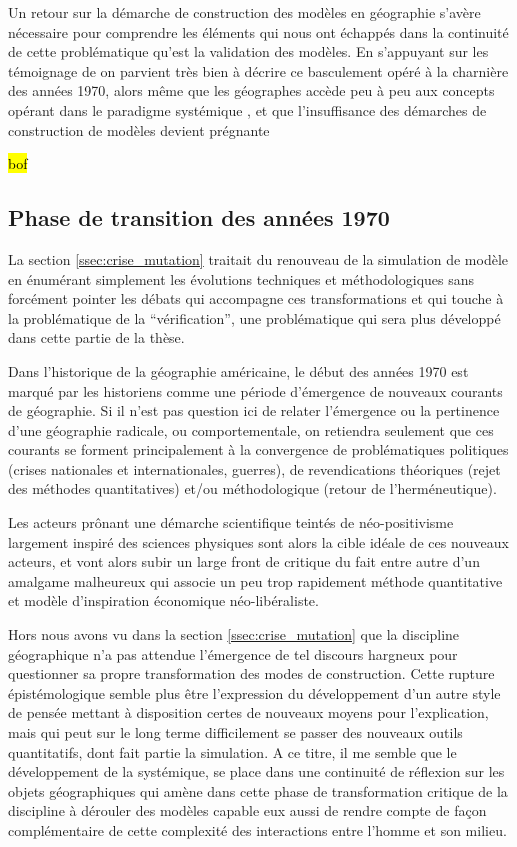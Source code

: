 Un retour sur la démarche de construction des modèles en géographie s'avère nécessaire pour comprendre les éléments qui nous ont échappés dans la continuité de cette problématique qu'est la validation des modèles. En s'appuyant sur les témoignage de \autocite{Batty2001, Pumain2003} on parvient très bien à décrire ce basculement opéré à la charnière des années 1970, alors même que les géographes accède peu à peu aux concepts opérant dans le paradigme systémique \autocite{Harvey1969}, et que l'insuffisance des démarches de construction de modèles devient prégnante 

\hl{bof}

\subsection{Phase de transition des années 1970} 
\label{ssec:transition_annee70}

La section \ref{ssec:crise_mutation} traitait du renouveau de la simulation de modèle en énumérant simplement les évolutions techniques et méthodologiques sans forcément pointer les débats qui accompagne ces transformations et qui touche à la problématique de la \enquote{vérification}, une problématique qui sera plus développé dans cette partie de la thèse.

Dans l'historique de la géographie américaine, le début des années 1970 est marqué par les historiens comme une période d'émergence de nouveaux courants de géographie.  Si il n'est pas question ici de relater l'émergence ou la pertinence d'une géographie radicale, ou comportementale, on retiendra seulement que ces courants se forment principalement à la convergence de problématiques politiques (crises nationales et internationales, guerres), de revendications théoriques (rejet des méthodes quantitatives) et/ou méthodologique (retour de l’herméneutique). 

Les acteurs prônant une démarche scientifique teintés de néo-positivisme largement inspiré des sciences physiques sont alors la cible idéale de ces nouveaux acteurs, et vont alors subir un large front de critique du fait entre autre d'un amalgame malheureux qui associe un peu trop rapidement méthode quantitative et modèle d'inspiration économique néo-libéraliste. \autocite[61-64]{Paterson1984} 

Hors nous avons vu dans la section \ref{ssec:crise_mutation} que la discipline géographique n'a pas attendue l'émergence de tel discours hargneux pour questionner sa propre transformation des modes de construction. Cette rupture épistémologique semble plus être l'expression du développement d'un autre style de pensée mettant à disposition certes de nouveaux moyens pour l'explication, mais qui peut sur le long terme difficilement se passer des nouveaux outils quantitatifs, dont fait partie la simulation. A ce titre, il me semble que le développement de la systémique, se place dans une continuité de réflexion sur les objets géographiques qui amène dans cette phase de transformation critique de la discipline à dérouler des modèles capable eux aussi de rendre compte de façon complémentaire de cette complexité des interactions entre l'homme et son milieu.

